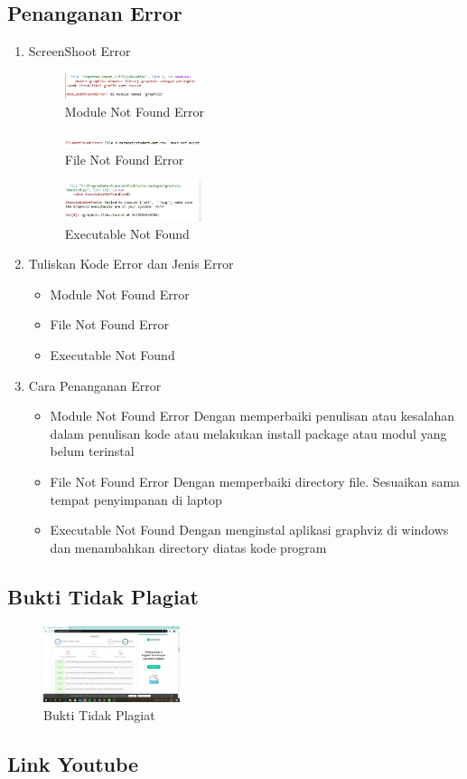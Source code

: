 \subsection{Penanganan Error}
\begin{enumerate}
\item ScreenShoot Error
	\begin{figure}[H]
		\includegraphics[width=4cm]{figures/1174054/2/error1.png}
		\centering
		\caption{Module Not Found Error}
	\end{figure}
	\begin{figure}[H]
		\includegraphics[width=4cm]{figures/1174054/2/error2.png}
		\centering
		\caption{File Not Found Error}
	\end{figure}
	\begin{figure}[H]
		\includegraphics[width=4cm]{figures/1174054/2/error3.png}
		\centering
		\caption{Executable Not Found}
	\end{figure}

	\item Tuliskan Kode Error dan Jenis Error
	\begin{itemize}
		\item Module Not Found Error
		\item File Not Found Error
		\item Executable Not Found
	\end{itemize}
	\item Cara Penanganan Error
	\begin{itemize}
		\item Module Not Found Error
		\hfill\break
		Dengan memperbaiki penulisan atau kesalahan dalam penulisan kode atau melakukan install package atau modul yang belum terinstal
		\item File Not Found Error
		\hfill\break
		Dengan memperbaiki directory file. Sesuaikan sama tempat penyimpanan di laptop
		\item Executable Not Found
		\hfill\break
		Dengan menginstal aplikasi graphviz di windows dan menambahkan directory diatas kode program
	\end{itemize}
\end{enumerate}

\subsection{Bukti Tidak Plagiat}
\begin{figure}[H]
	\includegraphics[width=4cm]{figures/1174054/2/plagiarisme.png}
	\centering
	\caption{Bukti Tidak Plagiat}
\end{figure}

\subsection{Link Youtube}
